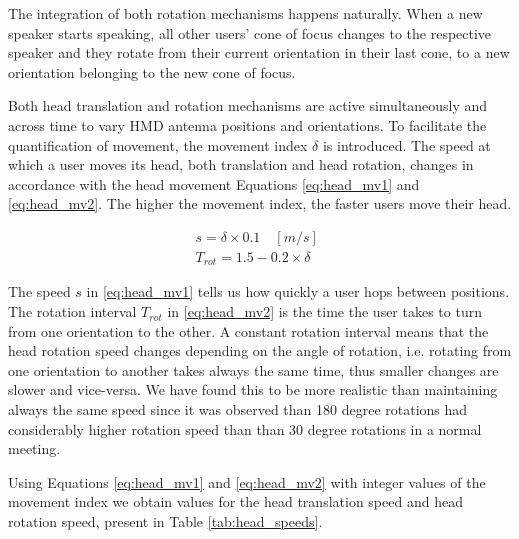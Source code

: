 
\vspace{.4cm}

The integration of both rotation mechanisms happens naturally. When a new speaker starts speaking, all other users' cone of focus changes to the respective speaker and they rotate from their current orientation in their last cone, to a new orientation belonging to the new cone of focus.

Both head translation and rotation mechanisms are active simultaneously and across time to vary \ac{HMD} antenna positions and orientations. To facilitate the quantification of movement, the movement index $\delta$ is introduced. The speed at which a user moves its head, both translation and head rotation, changes in accordance with the head movement Equations \eqref{eq:head_mv1} and \eqref{eq:head_mv2}. The higher the movement index, the faster users move their head.

\begin{gather} 
    s = \delta \times 0.1 \quad [m/s] \label{eq:head_mv1} \\
    T_{rot} = 1.5 - 0.2 \times \delta  \quad  \label{eq:head_mv2}
\end{gather}

The speed $s$ in \ref{eq:head_mv1} tells us how quickly a user hops between positions. The rotation interval $T_{rot}$ in \ref{eq:head_mv2} is the time the user takes to turn from one orientation to the other. A constant rotation interval means that the head rotation speed changes depending on the angle of rotation, i.e. rotating from one orientation to another takes always the same time, thus smaller changes are slower and vice-versa. We have found this to be more realistic than maintaining always the same speed since it was observed than 180 degree rotations had considerably higher rotation speed than than 30 degree rotations in a normal meeting.

Using Equations \eqref{eq:head_mv1} and \eqref{eq:head_mv2} with integer values of the movement index we obtain values for the head translation speed and head rotation speed, present in Table \ref{tab:head_speeds}.

\vspace{.3cm}

